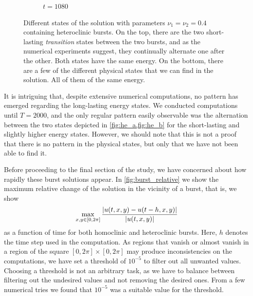 \documentclass[twoside]{article}
\begin{document}
\begin{figure}[ht]
\begin{subfigure}[ht]{0.248\textwidth}
    \caption{$t= 1080$}
  \end{subfigure}\hfill
  \caption{Different states of the solution with parameters $\nu_1=\nu_2=0.4$ containing heteroclinic bursts. On the top, there are the two short-lasting \emph{transition} states between the two bursts, and as the numerical experiments suggest, they continually alternate one after the other. Both states have the same energy. On the bottom, there are a few of the different physical states that we can find in the solution. All of them of the same energy.}
  \label{fig:slices_burst}
\end{figure}

It is intriguing that, despite extensive numerical computations, no pattern has emerged regarding the long-lasting energy states. We conducted computations until $T=2000$, and the only regular pattern easily observable was the alternation between the two states depicted in \cref{fig:he_a,fig:he_b} for the short-lasting and slightly higher energy states. However, we should note that this is not a proof that there is no pattern in the physical states, but only that we have not been able to find it.

Before proceeding to the final section of the study, we have concerned about how rapidly these burst solutions appear. In \cref{fig:burst_relative} we show the maximum relative change of the solution in the vicinity of a burst, that is, we show
\begin{equation}
  \max_{x,y\in [0,2\pi]} \frac{\abs{u(t,x,y)-u(t-h,x,y)}}{\abs{u(t,x,y)}}
\end{equation}
as a function of time for both homoclinic and heteroclinic bursts. Here, $h$ denotes the time step used in the computation. As regions that vanish or almost vanish in a region of the square $[0,2\pi]\times[0,2\pi]$ may produce inconsistencies on the computations, we have set a threshold of $10^{-5}$ to filter out all unwanted values. Choosing a threshold is not an arbitrary task, as we have to balance between filtering out the undesired values and not removing the desired ones. From a few numerical tries we found that $10^{-5}$ was a suitable value for the threshold.
\end{document}
